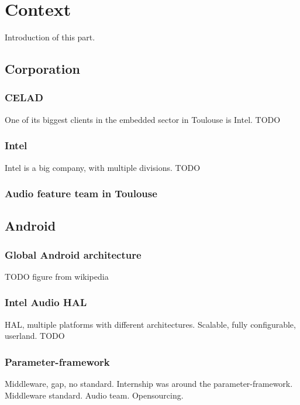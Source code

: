 \chapter{Context}

\begin{sectionIntro}
Introduction of this part.
\end{sectionIntro}

\section{Corporation}

\subsection{CELAD}
One of its biggest clients in the embedded sector in Toulouse is Intel.
TODO

\subsection{Intel}
Intel is a big company, with multiple divisions.
TODO

\subsection{Audio feature team in Toulouse}

\section{Android}

\subsection{Global Android architecture}
TODO figure from wikipedia

\subsection{Intel Audio HAL}
HAL, multiple platforms with different architectures.
Scalable, fully configurable, userland.
TODO

\subsection{Parameter-framework}
\label{sec:parameter-framework}
Middleware, gap, no standard.
Internship was around the parameter-framework. Middleware standard. Audio team. Opensourcing.
